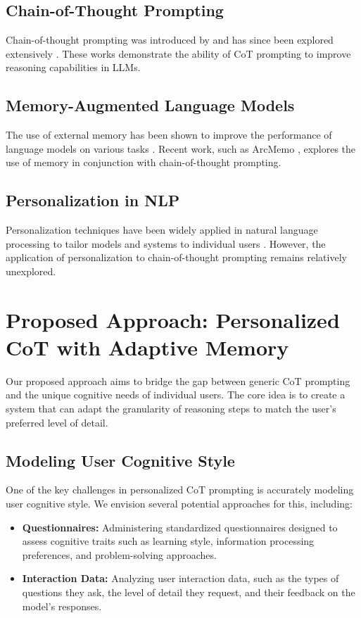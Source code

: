 \documentclass{article}
\begin{document}
\subsection{Chain-of-Thought Prompting}
Chain-of-thought prompting was introduced by \cite{wei2022chain} and has since been explored extensively \cite{kojima2022large, zhang2022automatic}. These works demonstrate the ability of CoT prompting to improve reasoning capabilities in LLMs.

\subsection{Memory-Augmented Language Models}
The use of external memory has been shown to improve the performance of language models on various tasks \cite{grave2016end, miller2016key}. Recent work, such as ArcMemo \cite{ho2025arcmemo}, explores the use of memory in conjunction with chain-of-thought prompting.

\subsection{Personalization in NLP}
Personalization techniques have been widely applied in natural language processing to tailor models and systems to individual users \cite{linden2003amazon, das2007google}. However, the application of personalization to chain-of-thought prompting remains relatively unexplored.

\section{Proposed Approach: Personalized CoT with Adaptive Memory}

Our proposed approach aims to bridge the gap between generic CoT prompting and the unique cognitive needs of individual users. The core idea is to create a system that can adapt the granularity of reasoning steps to match the user's preferred level of detail.

\subsection{Modeling User Cognitive Style}

One of the key challenges in personalized CoT prompting is accurately modeling user cognitive style. We envision several potential approaches for this, including:

\begin{itemize}
    \item \textbf{Questionnaires:} Administering standardized questionnaires designed to assess cognitive traits such as learning style, information processing preferences, and problem-solving approaches.
    \item \textbf{Interaction Data:} Analyzing user interaction data, such as the types of questions they ask, the level of detail they request, and their feedback on the model's responses.
\end{itemize}
\end{document}
